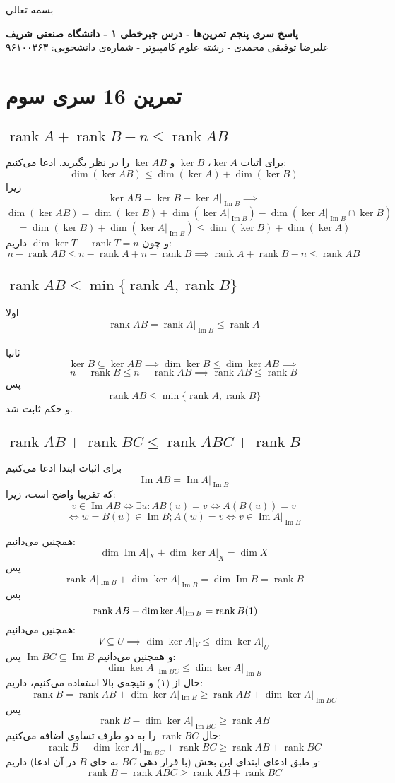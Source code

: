 \documentclass[12pt,a4paper]{article}
\DeclareMathOperator{\rank}{rank}
\DeclareMathOperator{\im}{Im}
\begin{document}
\begin{center}
	بسمه تعالی
\end{center}

\begin{center}
	\textbf{
		پاسخ سری پنجم تمرین‌ها
		- درس جبرخطی ۱ - دانشگاه صنعتی شریف}
	\\
	علیرضا توفیقی محمدی - رشته علوم کامپیوتر - شماره‌ی دانشجویی: ۹۶۱۰۰۳۶۳
\end{center}

\section{تمرین 16 سری سوم}
\subsection{
$\rank A + \rank B - n \leq \rank AB$
}
برای اثبات 
$\ker A$،
$\ker B$ و
$\ker AB$
را در نظر بگیرید.
ادعا می‌کنیم:
$$
\dim(\ker AB) \leq \dim(\ker A) + \dim(\ker B)
$$
زیرا 
$$
\ker AB = \ker B + \ker A|_{\im B}
\implies
$$$$
\dim(\ker AB) = \dim(\ker B) + \dim(\ker A|_{\im B}) - 
\dim(\ker A|_{\im B} \cap \ker B)
$$$$= \dim(\ker B) + \dim(\ker A|_{\im B}) \leq
\dim(\ker B) + \dim(\ker A)
$$
و چون 
$\dim \ker T + \rank T = n$
داریم:
$$n-\rank AB \leq n-\rank A + n - \rank B
\implies 
\rank A + \rank B - n \leq \rank AB
$$
\subsection{$\rank AB \leq \min\{\rank A, \rank B\}$}
اولا
$$\rank AB = \rank A|_{\im B} \leq \rank A$$
\\
ثانیا 
$$\ker B \subseteq \ker AB \implies
\dim\ker B \leq \dim\ker AB \implies$$$$
n-\rank B \leq n - \rank AB \implies
\rank AB \leq \rank B$$
پس
$$\rank AB \leq \min\{\rank A, \rank B \}$$
و حکم ثابت شد.

\subsection{$\rank AB + \rank BC \leq \rank ABC + \rank B$}
برای اثبات ابتدا ادعا می‌کنیم
$$\im AB = \im A|_{\im B}$$
که تقریبا واضح است، زیرا:
$$ v \in \im AB \iff \exists u: AB(u) = v \iff A(B(u)) = v $$$$\iff w = B(u) \in \im B; A(w) = v \iff v \in \im A|_{\im B}$$

همچنین می‌دانیم:
$$
\dim \im A|_{X} + \dim \ker A|_{X} = \dim X
$$
پس
$$
\rank A|_{\im B} + \dim \ker A|_{\im B} = \dim \im B = \rank B
$$
پس
$$
\rank AB + \dim \ker A|_{\im B} = \rank B \text{(1)\space\space\space\space\space}
$$
همچنین می‌دانیم:
$$
V \subseteq U \implies \dim \ker A|_V \leq \dim \ker A|_U
$$
و همچنین می‌دانیم 
$\im BC \subseteq \im B$
پس:
$$
\dim \ker A|_{\im BC} \leq \dim \ker A|_{\im B}
$$
حال از (۱) و نتیجه‌ی بالا استفاده می‌کنیم، داریم:
$$
\rank B = \rank AB + \dim \ker A|_{\im B} \geq 
\rank AB + \dim \ker A|_{\im BC}$$
پس
$$\rank B - \dim \ker A|_{\im BC} \geq \rank AB$$
حال 
$\rank BC$
را به دو طرف تساوی اضافه می‌کنیم:
$$\rank B - \dim \ker A|_{\im BC} + \rank BC\geq \rank AB + \rank BC$$
و طبق ادعای ابتدای این بخش (با قرار دهی $BC$ به حای $B$ در آن ادعا) داریم:
$$\rank B + \rank ABC\geq \rank AB + \rank BC$$
\end{document}
